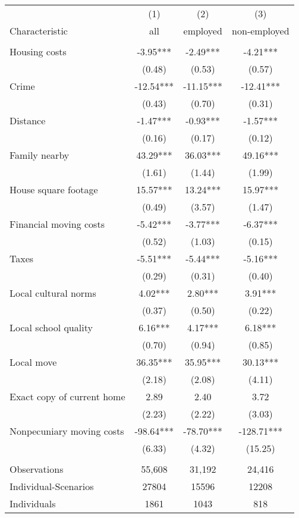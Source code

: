 \begin{tabular}{lccc} \hline
 & (1) & (2) & (3) \\
Characteristic & all & employed & non-employed \\ \hline
 &  &  &  \\
Housing costs & -3.95*** & -2.49*** & -4.21*** \\
 & (0.48) & (0.53) & (0.57) \\
Crime & -12.54*** & -11.15*** & -12.41*** \\
 & (0.43) & (0.70) & (0.31) \\
Distance & -1.47*** & -0.93*** & -1.57*** \\
 & (0.16) & (0.17) & (0.12) \\
Family nearby & 43.29*** & 36.03*** & 49.16*** \\
 & (1.61) & (1.44) & (1.99) \\
House square footage & 15.57*** & 13.24*** & 15.97*** \\
 & (0.49) & (3.57) & (1.47) \\
Financial moving costs & -5.42*** & -3.77*** & -6.37*** \\
 & (0.52) & (1.03) & (0.15) \\
Taxes & -5.51*** & -5.44*** & -5.16*** \\
 & (0.29) & (0.31) & (0.40) \\
Local cultural norms & 4.02*** & 2.80*** & 3.91*** \\
 & (0.37) & (0.50) & (0.22) \\
Local school quality & 6.16*** & 4.17*** & 6.18*** \\
 & (0.70) & (0.94) & (0.85) \\
Local move & 36.35*** & 35.95*** & 30.13*** \\
 & (2.18) & (2.08) & (4.11) \\
Exact copy of current home & 2.89 & 2.40 & 3.72 \\
 & (2.23) & (2.22) & (3.03) \\
Nonpecuniary moving costs & -98.64*** & -78.70*** & -128.71*** \\
 & (6.33) & (4.32) & (15.25) \\
 &  &  &  \\
Observations & 55,608 & 31,192 & 24,416 \\
Individual-Scenarios & 27804 & 15596 & 12208 \\
 Individuals & 1861 & 1043 & 818 \\ \hline
\end{tabular}
